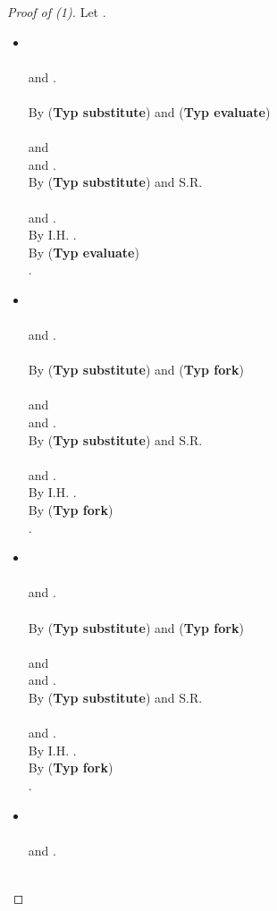 \documentclass{sigplanconf}
\newcommand{\trule}[1]{(\textbf{Typ #1})}
\begin{document}
\begin{proof}[Proof of (1)]
 Let .
\begin{itemize}
\item 
\\
\\
and .\\
  \\
By \trule{substitute} and \trule{evaluate}\\
 \\
 and \\
 and .\\
By \trule{substitute} and S.R.\\
 \\
 and .\\
By I.H. .\\
By \trule{evaluate}\\
 .\\
\item 
\\
\\
 and .\\
  \\
By \trule{substitute} and \trule{fork} \\
 \\
 and \\
 and .\\
By \trule{substitute} and S.R.\\
 \\
 and .\\
By I.H. .\\
By \trule{fork}\\
 .\\
\item 
\\
\\
 and .\\
  \\
By \trule{substitute} and \trule{fork} \\
 \\
 and \\
 and .\\
By \trule{substitute} and S.R.\\
 \\
 and .\\
By I.H. .\\
By \trule{fork}\\
 .\\
\item 
\\
\\
 and .\\
  \\

\end{itemize}
\end{proof}
\end{document}
